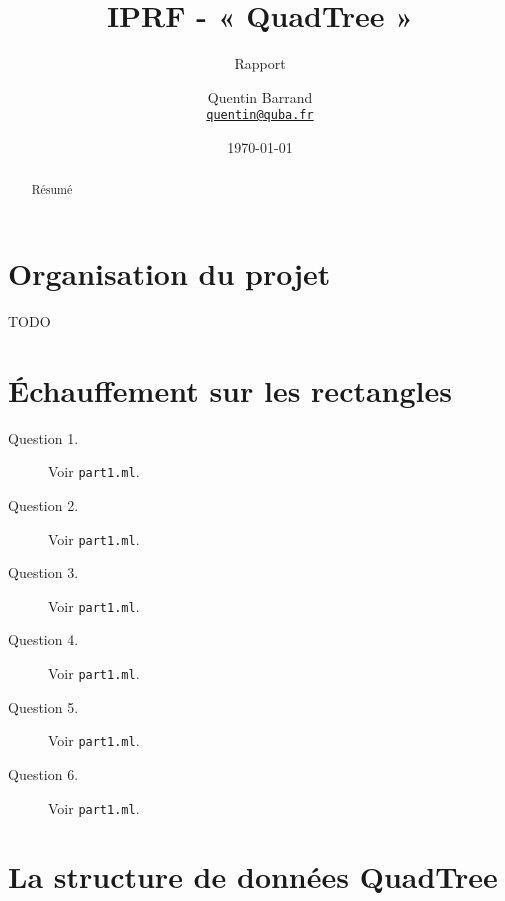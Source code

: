 \documentclass[11pt]{scrartcl}
\newcommand{\filename}[1]{\texttt{\textcolor{RawSienna}{#1}}}
\begin{document}
\title{\textbf{IPRF - « QuadTree »}}
\subtitle{Rapport}

\author{Quentin Barrand\\
		\href{mailto:quentin@quba.fr}{\texttt{quentin@quba.fr}}}
		
\date{\today}

\maketitle

\begin{abstract}
Résumé
\end{abstract}

\break

\section*{Organisation du projet}

TODO

\section{Échauffement sur les rectangles}

\begin{description}
\item[Question 1.] Voir \filename{part1.ml}.

\item[Question 2.] Voir \filename{part1.ml}.

\item[Question 3.] Voir \filename{part1.ml}.

\item[Question 4.] Voir \filename{part1.ml}.

\item[Question 5.] Voir \filename{part1.ml}.

\item[Question 6.] Voir \filename{part1.ml}.
\end{description}

\section{La structure de données QuadTree}
\end{document}
